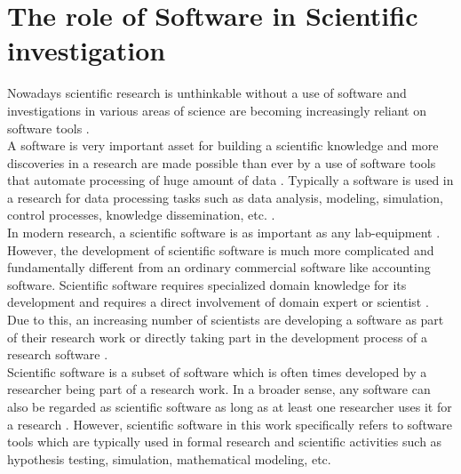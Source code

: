 \chapter{The role of Software in Scientific investigation}
\label{ch:Roles}

%

Nowadays scientific research is unthinkable without a use of software and investigations in various areas of science are becoming increasingly reliant on software tools \citep{goble2014better, storer2017bridging, hannay2009scientists, jimenez2017four}. \\

A software is very important asset for building a scientific knowledge and more discoveries in a research are made possible than ever by a use of software tools that automate processing of huge amount of data \citep{jimenez2017four}. Typically a software is used in a research for data processing tasks such as data analysis, modeling, simulation, control processes, knowledge dissemination, etc. \citep{hannay2009scientists, pan2016disciplinary}. \\



In modern research, a scientific software is as important as any lab-equipment \citep{wilson2014best}. However, the development of scientific software is much more complicated and fundamentally different from an ordinary commercial software like accounting software. Scientific software requires specialized domain knowledge for its development and requires a direct involvement of domain expert or scientist \citep{wilson2014best, segal2008developing}. Due to this, an increasing number of scientists are developing a software as part of their research work or directly taking part in the development process of a research software \citep{jimenez2017four, kanewala2014testing}. \\

Scientific software is a subset of software which is often times developed by a researcher being part of a research work. In a broader sense, any software can also be regarded as scientific software as long as at least one researcher uses it for a research \citep{VanessaResearch2020}. However, scientific software in this work specifically refers to software tools which are typically used in formal research and scientific activities such as hypothesis testing, simulation, mathematical modeling, etc.  \\


